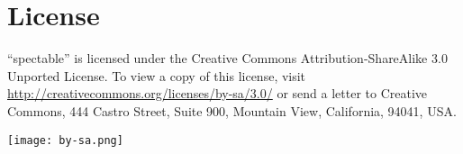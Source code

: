 \documentclass[12pt,a4paper]{scrreprt}
\begin{document}
\section{License}

``spectable'' is licensed under the Creative Commons Attribution-ShareAlike 3.0 Unported License. To view a copy of this license, visit \url{http://creativecommons.org/licenses/by-sa/3.0/} or send a letter to Creative Commons, 444 Castro Street, Suite 900, Mountain View, California, 94041, USA. \\
\begin{center}
\texttt{[image: by-sa.png]}
\end{center}
\end{document}
